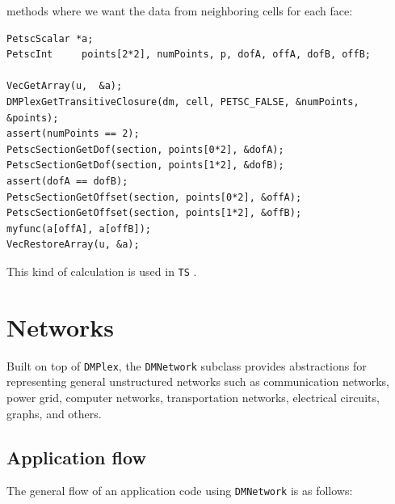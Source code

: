 methods where we want the data from neighboring cells for each face:
\begin{lstlisting}
PetscScalar *a;
PetscInt     points[2*2], numPoints, p, dofA, offA, dofB, offB;

VecGetArray(u,  &a);
DMPlexGetTransitiveClosure(dm, cell, PETSC_FALSE, &numPoints, &points);
assert(numPoints == 2);
PetscSectionGetDof(section, points[0*2], &dofA);
PetscSectionGetDof(section, points[1*2], &dofB);
assert(dofA == dofB);
PetscSectionGetOffset(section, points[0*2], &offA);
PetscSectionGetOffset(section, points[1*2], &offB);
myfunc(a[offA], a[offB]);
VecRestoreArray(u, &a);
\end{lstlisting}
This kind of calculation is used in \lstinline{TS} \href{https://www.mcs.anl.gov/petsc/petsc-current/src/ts/tutorials/ex11.c.html}{}.

\section{Networks}
Built on top of \lstinline{DMPlex}, the \lstinline{DMNetwork} subclass provides abstractions for representing general unstructured
networks such as communication networks, power grid, computer networks, transportation networks, electrical circuits, graphs, and others.

\subsection{Application flow}
The general flow of an application code using \lstinline{DMNetwork} is as follows:

